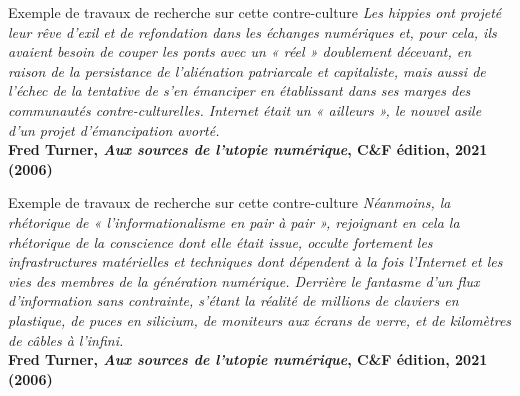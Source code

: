 \begin{frame}{Exemple de travaux de recherche sur cette contre-culture}
    \centering
    {\small
    \textit{Les hippies ont projeté leur rêve d’exil et de refondation dans les échanges numériques et, pour cela, ils avaient besoin de couper les ponts avec un « réel » doublement décevant, en raison de la persistance de l’aliénation patriarcale et capitaliste, mais aussi de l’échec de la tentative de s’en émanciper en établissant dans ses marges des communautés contre-culturelles. Internet était un « ailleurs », le nouvel asile d’un projet d’émancipation avorté.}}\\
    \textbf{Fred Turner, \textit{Aux sources de l’utopie numérique}, C\&F édition, 2021 (2006)}
\end{frame}

\begin{frame}{Exemple de travaux de recherche sur cette contre-culture}
    \centering
    {\small \textit{Néanmoins, la rhétorique de « l’informationalisme en pair à pair », rejoignant en cela la rhétorique de la conscience dont elle était issue, occulte fortement les infrastructures matérielles et techniques dont dépendent à la fois l’Internet et les vies des membres de la génération numérique. Derrière le fantasme d’un flux d’information sans contrainte, s’étant la réalité de millions de claviers en plastique, de puces en silicium, de moniteurs aux écrans de verre, et de kilomètres de câbles à l’infini.}}\\
    \textbf{Fred Turner, \textit{Aux sources de l’utopie numérique}, C\&F édition, 2021 (2006)}
\end{frame}